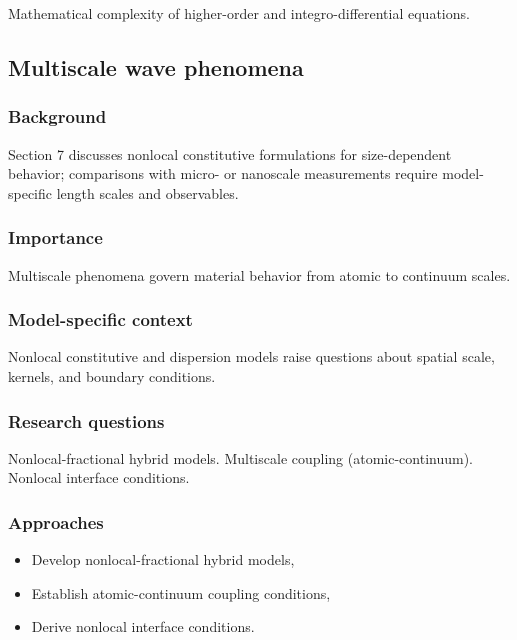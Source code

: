 Mathematical complexity of higher-order and integro-differential equations.

\subsection{Multiscale wave phenomena}
\label{sec:multiscale-waves}

\subsubsection{Background}

Section 7 discusses nonlocal constitutive formulations for size-dependent behavior; comparisons with micro- or nanoscale measurements require model-specific length scales and observables.

\subsubsection{Importance}

Multiscale phenomena govern material behavior from atomic to continuum scales.

\subsubsection{Model-specific context}

Nonlocal constitutive and dispersion models raise questions about spatial scale, kernels, and boundary conditions.

\subsubsection{Research questions}

Nonlocal-fractional hybrid models. Multiscale coupling (atomic-continuum). Nonlocal interface conditions.

\subsubsection{Approaches}

\begin{itemize}
\item Develop nonlocal-fractional hybrid models,
\item Establish atomic-continuum coupling conditions,
\item Derive nonlocal interface conditions.
\end{itemize}

